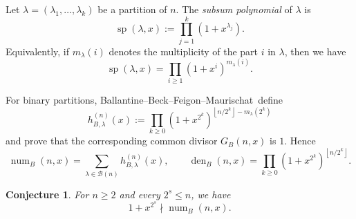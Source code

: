 \documentclass[12pt]{amsart}
\newtheorem{conjecture}{Conjecture}
\DeclareMathOperator{\spol}{sp}
\DeclareMathOperator{\num}{num}
\DeclareMathOperator{\den}{den}
\newcommand{\floor}[1]{\left\lfloor #1\right\rfloor}
\newcommand{\bbfm}{Ballantine--Beck--Feigon--Maurischat}
\newcommand{\BB}{\mathcal B}
\begin{document}
Let \(\lambda=(\lambda_1,\ldots,\lambda_k)\) be a partition of \(n\).  The
\emph{subsum polynomial} of \(\lambda\) is
\begin{equation}
   \spol(\lambda,x):=\prod_{j=1}^k(1+x^{\lambda_j}).
\end{equation}
Equivalently, if \(m_\lambda(i)\) denotes the multiplicity of the part \(i\) in
\(\lambda\), then we have
\[
   \spol(\lambda,x)=\prod_{i\ge1}(1+x^i)^{m_\lambda(i)}.
\]

For binary partitions, \bbfm\ define
\[
   h_{B,\lambda}^{(n)}(x)
   :=\prod_{k\ge0}(1+x^{2^k})^{\floor{n/2^k}-m_\lambda(2^k)}
\]
and prove that the corresponding common divisor \(G_B(n,x)\) is \(1\).  Hence
\[
   \num_B(n,x)=\sum_{\lambda\in\BB(n)}h_{B,\lambda}^{(n)}(x),
   \qquad
   \den_B(n,x)=\prod_{k\ge0}(1+x^{2^k})^{\floor{n/2^k}}.
\]

\begin{conjecture}\label{conj:conj7} For \(n\ge2\) and every \(2^s\le n\), we have
\[
   1+x^{2^s}\nmid \num_B(n,x).
\]
\end{conjecture}
\end{document}

